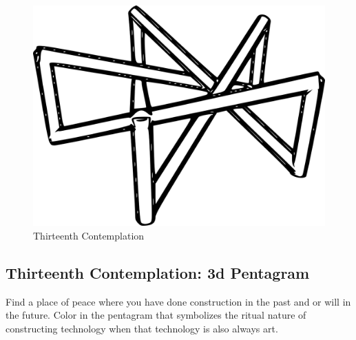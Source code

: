 \begin{figure}[htbp]
\centering
\includegraphics{images/contemplations/contemplation13C.png}
\caption{Thirteenth Contemplation}
\end{figure}

\subsection{Thirteenth Contemplation: 3d
Pentagram}\label{thirteenth-contemplation-3d-pentagram}

Find a place of peace where you have done construction in the past and
or will in the future. Color in the pentagram that symbolizes the ritual
nature of constructing technology when that technology is also always
art.
